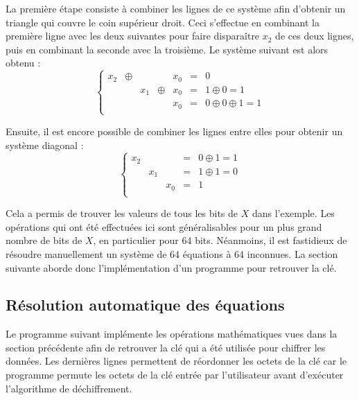 \documentclass[a4paper,10pt]{article}
\begin{document}
La première étape consiste à combiner les lignes de ce système afin d'obtenir un triangle qui couvre le coin supérieur droit. Ceci s'effectue en combinant la première ligne avec les deux suivantes pour faire disparaître $x_2$ de ces deux lignes, puis en combinant la seconde avec la troisième. Le système suivant est alors obtenu :
\begin{displaymath}
\left\{\begin{array}{ccccccl}
    x_2 &\oplus&     &      & x_0 &=& 0 \\
        &      & x_1 &\oplus& x_0 &=& 1 \oplus 0 = 1 \\
        &      &     &      & x_0 &=& 0 \oplus 0 \oplus 1 = 1 \\
\end{array}\right.
\end{displaymath}

Ensuite, il est encore possible de combiner les lignes entre elles pour obtenir un système diagonal :
\begin{displaymath}
\left\{\begin{array}{ccccl}
    x_2 &     &     &=& 0 \oplus 1 = 1 \\
        & x_1 &     &=& 1 \oplus 1 = 0 \\
        &     & x_0 &=& 1 \\
\end{array}\right.
\end{displaymath}

Cela a permis de trouver les valeurs de tous les bits de $X$ dans l'exemple. Les opérations qui ont été effectuées ici sont généralisables pour un plus grand nombre de bits de $X$, en particulier pour 64 bits. Néanmoins, il est fastidieux de résoudre manuellement un système de 64 équations à 64 inconnues. La section suivante aborde donc l'implémentation d'un programme pour retrouver la clé.

\subsection{Résolution automatique des équations}

Le programme suivant implémente les opérations mathématiques vues dans la section précédente afin de retrouver la clé qui a été utilisée pour chiffrer les données. Les dernières lignes permettent de réordonner les octets de la clé car le programme permute les octets de la clé entrée par l'utilisateur avant d'exécuter l'algorithme de déchiffrement.
\end{document}
